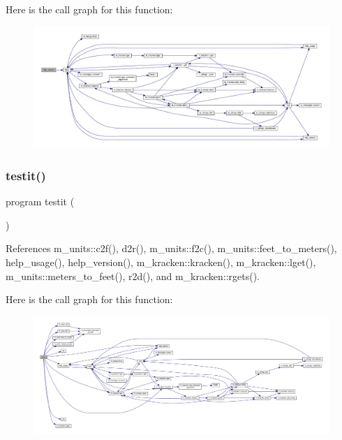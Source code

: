 Here is the call graph for this function\+:
\nopagebreak
\begin{figure}[H]
\begin{center}
\leavevmode
\includegraphics[width=350pt]{exchange_8f90_a39c21619b08a3c22f19e2306efd7f766_cgraph}
\end{center}
\end{figure}
\mbox{\label{exchange_8f90_a483d2219923eccf493a883fceee5a424}} 
\subsubsection{\texorpdfstring{testit()}{testit()}}
{\footnotesize\ttfamily program testit (\begin{DoxyParamCaption}{ }\end{DoxyParamCaption})}



References m\+\_\+units\+::c2f(), d2r(), m\+\_\+units\+::f2c(), m\+\_\+units\+::feet\+\_\+to\+\_\+meters(), help\+\_\+usage(), help\+\_\+version(), m\+\_\+kracken\+::kracken(), m\+\_\+kracken\+::lget(), m\+\_\+units\+::meters\+\_\+to\+\_\+feet(), r2d(), and m\+\_\+kracken\+::rgets().

Here is the call graph for this function\+:
\nopagebreak
\begin{figure}[H]
\begin{center}
\leavevmode
\includegraphics[width=350pt]{exchange_8f90_a483d2219923eccf493a883fceee5a424_cgraph}
\end{center}
\end{figure}
